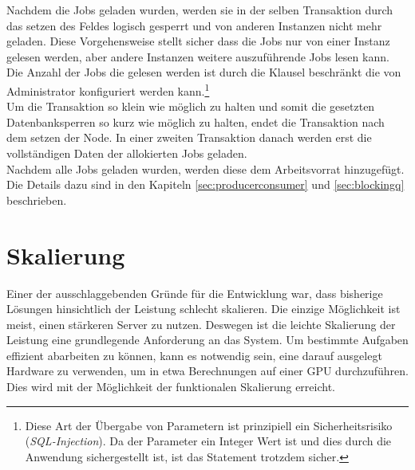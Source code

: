 Nachdem die Jobs geladen wurden, werden sie in der selben Transaktion durch das setzen des Feldes  logisch gesperrt und von anderen Instanzen nicht mehr geladen. Diese Vorgehensweise stellt sicher dass die Jobs nur von einer Instanz gelesen werden, aber andere Instanzen weitere auszuführende Jobs lesen kann. Die Anzahl der Jobs die gelesen werden ist durch die  Klausel beschränkt die von Administrator konfiguriert werden kann.\footnote{Diese Art der Übergabe von Parametern ist prinzipiell ein Sicherheitsrisiko (\emph{SQL-Injection}). Da der Parameter ein Integer Wert ist und dies durch die Anwendung sichergestellt ist, ist das Statement trotzdem sicher.}
\\Um die Transaktion so klein wie möglich zu halten und somit die gesetzten Datenbanksperren so kurz wie möglich zu halten, endet die Transaktion nach dem setzen der Node. In einer zweiten Transaktion danach werden erst die vollständigen Daten der allokierten Jobs geladen.
\\Nachdem alle Jobs geladen wurden, werden diese dem Arbeitsvorrat hinzugefügt. Die Details dazu sind in den Kapiteln \ref{sec:producerconsumer} und \ref{sec:blockingq} beschrieben.
\section{Skalierung}
Einer der ausschlaggebenden Gründe für die Entwicklung war, dass bisherige Lösungen hinsichtlich der Leistung schlecht skalieren. Die einzige Möglichkeit ist meist, einen stärkeren Server zu nutzen. Deswegen ist die leichte Skalierung der Leistung eine grundlegende Anforderung an das System. Um bestimmte Aufgaben effizient abarbeiten zu können, kann es notwendig sein, eine darauf ausgelegt Hardware zu verwenden, um in etwa Berechnungen auf einer GPU durchzuführen. Dies wird mit der Möglichkeit der funktionalen Skalierung erreicht.
